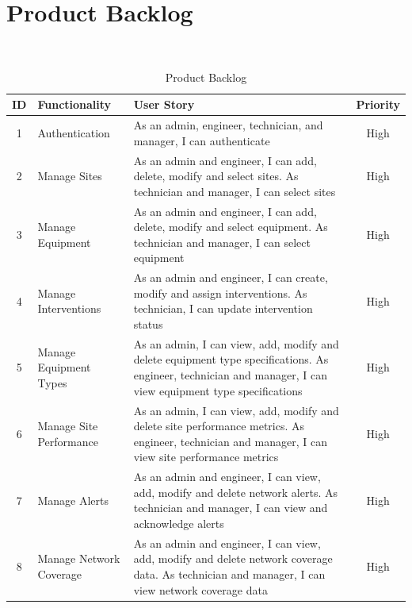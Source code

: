 \section{Product Backlog}\\
\begin{longtable}{|c|p{4cm}|p{7cm}|c|}
\caption{Product Backlog} \\ \hline
\textbf{ID} & \textbf{Functionality} & \textbf{User Story} & \textbf{Priority} \\ \hline
1 & Authentication & As an admin, engineer, technician, and manager, I can authenticate & High \\ \hline
2 & Manage Sites & As an admin and engineer, I can add, delete, modify and select sites.\vspace{0.25cm} \newline As technician and manager, I can select sites & High \\ \hline
3 & Manage Equipment & As an admin and engineer, I can add, delete, modify and select equipment.\vspace{0.25cm} \newline As technician and manager, I can select equipment & High \\ \hline
4 & Manage Interventions & As an admin and engineer, I can create, modify and assign interventions.\vspace{0.25cm} \newline As technician, I can update intervention status & High \\ \hline
5 & Manage Equipment Types & As an admin, I can view, add, modify and delete equipment type specifications.\vspace{0.25cm} \newline As engineer, technician and manager, I can view equipment type specifications & High \\ \hline
6 & Manage Site Performance & As an admin, I can view, add, modify and delete site performance metrics.\vspace{0.25cm} \newline As engineer, technician and manager, I can view site performance metrics & High \\ \hline
7 & Manage Alerts & As an admin and engineer, I can view, add, modify and delete network alerts.\vspace{0.25cm} \newline As technician and manager, I can view and acknowledge alerts & High \\ \hline
8 & Manage Network Coverage & As an admin and engineer, I can view, add, modify and delete network coverage data.\vspace{0.25cm}  \newline As technician and manager, I can view network coverage data & High \\ \hline

\end{longtable}
